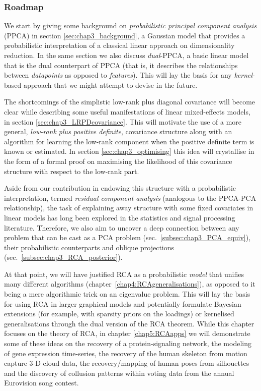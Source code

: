   
  \subsubsection*{Roadmap}
    We start by giving some background on \textit{probabilistic principal component analysis} (PPCA) in section \ref{sec:chap3_background}, a Gaussian model that provides a probabilistic interpretation of a classical linear approach on dimensionality reduction.
    In the same section we also discuss \textit{dual}-PPCA, a basic linear model that is the dual counterpart of PPCA (that is, it describes the relationships between \emph{datapoints} as opposed to \emph{features}).
    This will lay the basis for any \textit{kernel}-based approach that we might attempt to devise in the future.
    
    The shortcomings of the simplistic low-rank plus diagonal covariance will become clear while describing some useful manifestations of linear mixed-effects models, in section \ref{sec:chap3_LRPDcovariance}.
    This will motivate the use of a more general, \textit{low-rank plus positive definite}, covariance structure along with an algorithm for learning the low-rank component when the positive definite term is known or estimated.
    In section \ref{sec:chap3_optimising} this idea will crystallise in the form of a formal proof on maximising the likelihood of this covariance structure with respect to the low-rank part.
    
    Aside from our contribution in endowing this structure with a probabilistic interpretation, termed \textit{residual component analysis} (analogous to the PPCA-PCA relationship), the task of explaining away structure with some fixed covariates in linear models has long been explored in the statistics and signal processing literature. Therefore, we also aim to uncover a deep connection between any problem that can be cast as a PCA problem (sec.~\ref{subsec:chap3_PCA_equiv}), their probabilistic counterparts  and oblique projections (sec.~\ref{subsec:chap3_RCA_posterior}).
    
    At that point, we will have justified RCA as a probabilistic \emph{model} that unifies many different algorithms (chapter~\ref{chap4:RCAgeneralisations}), as opposed to it being a mere algorithmic trick on an eigenvalue problem.
    This will lay the basis for using RCA in larger graphical models and potentially formulate Bayesian extensions (for example, with sparsity priors on the loadings) or kernelised generalisations through the dual version of the RCA theorem.
    While this chapter focuses on the theory of RCA, in chapter \ref{chap5:RCAapps} we will demonstrate some of these ideas on the recovery of a protein-signaling network, the modeling of gene expression time-series, the recovery of the human skeleton from motion capture 3-D cloud data, the recovery/mapping of human poses from silhouettes and the discovery of collusion patterns within voting data from the annual Eurovision song contest.

